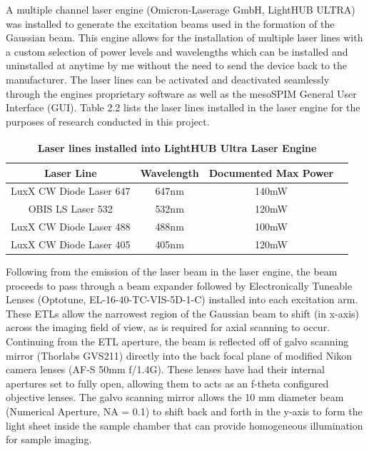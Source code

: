 A multiple channel laser engine (Omicron-Laserage GmbH, LightHUB ULTRA) was installed to generate the excitation beams used in the formation of the Gaussian beam. This engine allows for the installation of multiple laser lines with a custom selection of power levels and wavelengths which can be installed and uninstalled at anytime by me without the need to send the device back to the manufacturer. The laser lines can be  activated and deactivated seamlessly through the engines proprietary software as well as the mesoSPIM General User Interface (GUI). Table 2.2 lists the laser lines installed in the laser engine for the purposes of research conducted in this project. 


\begin{table} [H]
    \centering
    
    \begin{tabular}{|c|c|c|c|}
            \hline
            \textbf{Laser Line} & \textbf{Wavelength} & \textbf{Documented Max Power}\\ \hline
             
            LuxX CW Diode Laser 647& 647nm & 140mW\\
            
            OBIS LS Laser 532 & 532nm & 120mW\\
        
            LuxX CW Diode Laser 488 & 488nm & 100mW\\
           
            LuxX CW Diode Laser 405&  405nm & 120mW\\ \hline
    \end{tabular}
    \medskip
    \caption{\textbf{Laser lines installed into LightHUB Ultra\textsuperscript{\textregistered} Laser Engine}}
    \medskip
\end{table}

Following from the emission of the laser beam in the laser engine, the beam proceeds to pass through a beam expander followed by Electronically Tuneable Lenses (Optotune, EL-16-40-TC-VIS-5D-1-C) installed into each excitation arm. These ETLs allow the narrowest region of the Gaussian beam to shift (in x-axis) across the imaging field of view, as is required for axial scanning to occur. Continuing from the ETL aperture, the beam is reflected off of galvo scanning mirror (Thorlabs GVS211) directly into the back focal plane of modified Nikon camera lenses (AF-S 50mm f/1.4G). These lenses have had their internal apertures set to fully open, allowing them to acts as an f-theta configured objective lenses. The galvo scanning mirror allows the 10 mm diameter beam (Numerical Aperture, NA = 0.1) to shift back and forth in the y-axis to form the light sheet inside the sample chamber that can provide homogeneous illumination for sample imaging.

